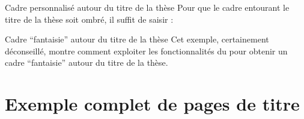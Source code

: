 \begin{dbexample}{Cadre personnalisé autour du titre de la thèse}{}
  Pour que le cadre entourant le titre de la thèse soit ombré, il suffit de
  saisir :
\begin{preamblecode}
\maketitle[frametitle=shadowbox]
\end{preamblecode}
\end{dbexample}

\begin{dbexample}{Cadre \enquote{fantaisie} autour du titre de la thèse}{}
  Cet exemple, certainement déconseillé, montre comment exploiter les
  fonctionnalités du  pour obtenir un cadre
  \enquote{fantaisie} autour du titre de la thèse.%
  \NoAutoSpacing%
\begin{preamblecode}
\maketitle[frametitle={colback=red!50!white,beamer}]
\end{preamblecode}
\end{dbexample}

\section{Exemple complet de pages de titre}
\label{sec-exemple-complet}

